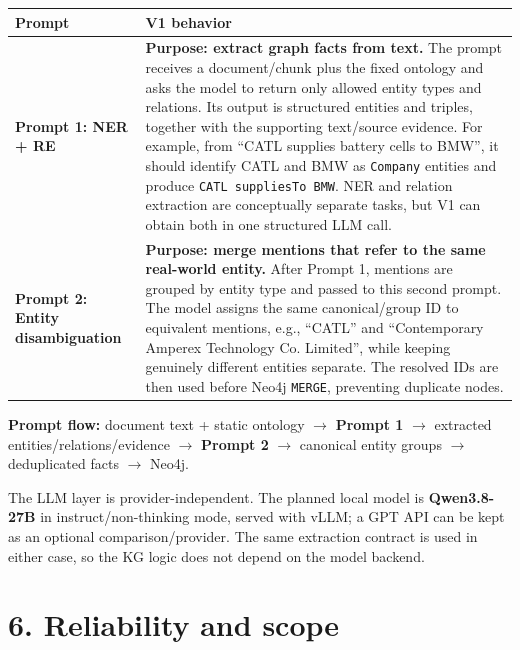 \documentclass[10pt,a4paper]{article}
\begin{document}
\begin{tabularx}{\textwidth}{>{\bfseries\sffamily}p{} X}
\toprule
Prompt & V1 behavior \\
\midrule
Prompt 1: NER + RE &
\textbf{Purpose: extract graph facts from text.} The prompt receives a document/chunk plus the fixed ontology and asks the model to return only allowed entity types and relations. Its output is structured entities and triples, together with the supporting text/source evidence. For example, from ``CATL supplies battery cells to BMW'', it should identify CATL and BMW as \texttt{Company} entities and produce \texttt{CATL suppliesTo BMW}. NER and relation extraction are conceptually separate tasks, but V1 can obtain both in one structured LLM call. \\

Prompt 2: Entity disambiguation &
\textbf{Purpose: merge mentions that refer to the same real-world entity.} After Prompt 1, mentions are grouped by entity type and passed to this second prompt. The model assigns the same canonical/group ID to equivalent mentions, e.g., ``CATL'' and ``Contemporary Amperex Technology Co. Limited'', while keeping genuinely different entities separate. The resolved IDs are then used before Neo4j \texttt{MERGE}, preventing duplicate nodes. \\
\bottomrule
\end{tabularx}

\begin{graybox}
\small
\textbf{Prompt flow:} document text + static ontology $\rightarrow$ \textbf{Prompt 1} $\rightarrow$ extracted entities/relations/evidence $\rightarrow$ \textbf{Prompt 2} $\rightarrow$ canonical entity groups $\rightarrow$ deduplicated facts $\rightarrow$ Neo4j.
\end{graybox}

The LLM layer is provider-independent. The planned local model is \textbf{Qwen3.8-27B} in instruct/non-thinking mode, served with vLLM; a GPT API can be kept as an optional comparison/provider. The same extraction contract is used in either case, so the KG logic does not depend on the model backend.

\section{6. Reliability and scope}
\end{document}
